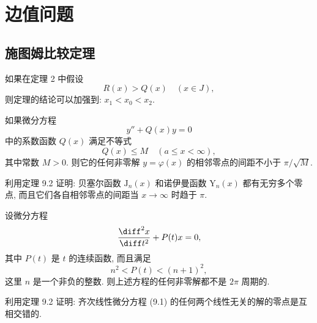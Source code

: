 \chapter{边值问题}

\section{施图姆比较定理}

\begin{exercise}
  如果在定理 2 中假设
  \[R(x) > Q(x)\quad (x\in J),\]
  则定理的结论可以加强到: $x_1 < x_0 < x_2$.
\end{exercise}


\begin{exercise}
  如果微分方程
  \[y'' + Q(x)y = 0\]
  中的系数函数 $Q(x)$ 满足不等式
  \[Q(x) \leq M\quad (a\leq x<\infty),\]
  其中常数 $M>0$. 则它的任何非零解 $y = \varphi(x)$ 的相邻零点的间距不小于 $\pi/\sqrt{M}$.
\end{exercise}


\begin{exercise}
  利用定理 9.2 证明: 贝塞尔函数 $\mathrm{J}_n(x)$ 和诺伊曼函数 $\mathrm{Y}_n(x)$
  都有无穷多个零点, 而且它们各自相邻零点的间距当 $x\to\infty$ 时趋于 $\pi$.
\end{exercise}


\begin{exercise}
  设微分方程
  \[\frac{\diff^2 x}{\diff t^2} + P(t)x = 0,\]
  其中 $P(t)$ 是 $t$ 的连续函数, 而且满足
  \[n^2 < P(t) < (n+1)^2,\]
  这里 $n$ 是一个非负的整数.
  则上述方程的任何非零解都不是 $2\pi$ 周期的.
\end{exercise}


\begin{exercise}
  利用定理 9.2 证明: 齐次线性微分方程 (9.1) 的任何两个线性无关的解的零点是互相交错的.
\end{exercise}